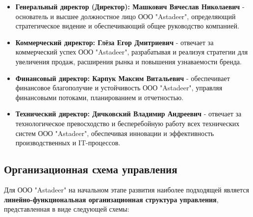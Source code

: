     \begin{itemize}
        \item \textbf{Генеральный директор (Директор): Машкович Вячеслав Николаевич} - основатель и высшее должностное лицо ООО "Astadeer", определяющий стратегическое видение и обеспечивающий общее руководство компанией.
        \item \textbf{Коммерческий директор: Глёза Егор Дмитриевич} - отвечает за коммерческий успех ООО "Astadeer", разрабатывая и реализуя стратегии для увеличения продаж, расширения рынка и повышения узнаваемости бренда.
        \item \textbf{Финансовый директор: Карпук Максим Витальевич} - обеспечивает финансовое благополучие и устойчивость ООО "Astadeer", управляя финансовыми потоками, планированием и отчетностью.
        \item \textbf{Технический директор: Дичковский Владимир Андреевич} - отвечает за технологическое превосходство и бесперебойную работу всех технических систем ООО "Astadeer", обеспечивая инновации и эффективность производственных и IT-процессов.
    \end{itemize}

    \subsection{Организационная схема управления}

    Для ООО "Astadeer" на начальном этапе развития наиболее подходящей является \textbf{линейно-функциональная организационная структура управления}, представленная в виде следующей схемы:

    \vspace{0.5cm}

    \begin{center}
    \end{center}

